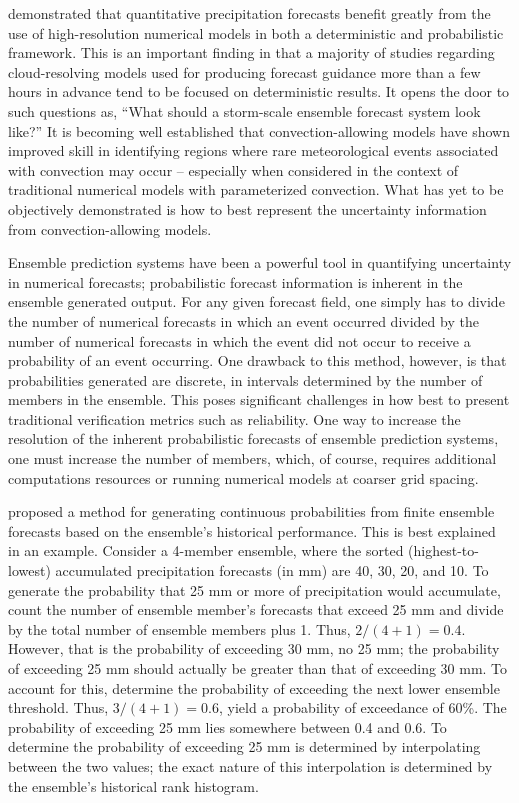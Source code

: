 

\cite{schwartz2010camresolution} demonstrated that quantitative precipitation forecasts benefit greatly from the use of high-resolution numerical models in both a deterministic and probabilistic framework. This is an important finding in that a majority of studies regarding cloud-resolving models used for producing forecast guidance more than a few hours in advance tend to be focused on deterministic results. It opens the door to such questions as, ``What should a storm-scale ensemble forecast system look like?'' It is becoming well established that convection-allowing models have shown improved skill in identifying regions where rare meteorological events associated with convection may occur -- especially when considered in the context of traditional numerical  models with parameterized convection. What has yet to be objectively demonstrated is how to best represent the uncertainty information from convection-allowing models.


Ensemble prediction systems have been a powerful tool in quantifying uncertainty in numerical forecasts; probabilistic forecast information is inherent in the ensemble generated output. For any given forecast field, one simply has to divide the number of numerical forecasts in which an event occurred divided by the number of numerical forecasts in which the event did not occur to receive a probability of an event occurring. One drawback to this method, however, is that probabilities generated are discrete, in intervals determined by the number of members in the ensemble. This poses significant challenges in how best to present traditional verification metrics such as reliability. One way to increase the resolution of the inherent probabilistic forecasts of ensemble prediction systems, one must increase the number of members, which, of course, requires additional computations resources or running numerical models at coarser grid spacing.


\cite{hamill1998eps} proposed a method for generating continuous probabilities from finite ensemble forecasts based on the ensemble's historical performance. This is best explained in an example. Consider a 4-member ensemble, where the sorted (highest-to-lowest) accumulated precipitation forecasts (in mm) are 40, 30, 20, and 10. To generate the probability that 25 mm or more of precipitation would accumulate, count the number of ensemble member's forecasts that exceed 25 mm and divide by the total number of ensemble members plus 1. Thus, $2 / (4+1) = 0.4$. However, that is the probability of exceeding 30 mm, no 25 mm; the probability of exceeding 25 mm should actually be greater than that of exceeding 30 mm. To account for this, determine the probability of exceeding the next lower ensemble threshold. Thus, $3 / (4+1) = 0.6$, yield a probability of exceedance of 60\%. The probability of exceeding 25 mm lies somewhere between 0.4 and 0.6. To determine the probability of exceeding 25 mm is determined by interpolating between the two values; the exact nature of this interpolation is determined by the ensemble's historical rank histogram.


